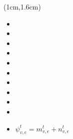 \begin{frame}
\begin{overlayarea}{\textwidth}{3cm}
\end{overlayarea}



\begin{center}
\begin{textblock*}{1\textwidth}(1cm,1.6cm)
\begin{itemize} \englishfont 
	\item[\ding{111}]  {\color{cqublue}{任务上传时间}}
	\item
	\item 
	\item 
	\item[\ding{111}]  {\color{cqublue}{任务处理时间}}
	\item
	\item
	\item 
	\item 
	\item<5->[\ding{111}]  {\color{cqublue}{任务服务时间}}
	\item<5-> $\psi_{v, e}^{t} = m_{v, e}^{t} +  n_{v, e}^{t}$
\end{itemize}
\end{textblock*}
\end{center}

\end{frame}

